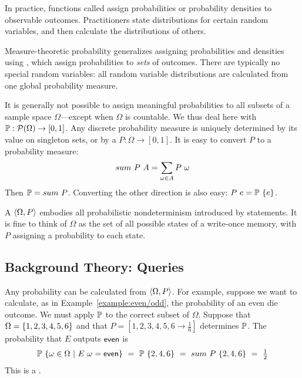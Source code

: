 In practice, functions called  assign probabilities or probability densities to observable outcomes. Practitioners state distributions for certain random variables, and then calculate the distributions of others.

Measure-theoretic probability generalizes assigning probabilities and densities using , which assign probabilities to \textit{sets} of outcomes. There are typically no special random variables: all random variable distributions are calculated from one global probability measure.

It is generally not possible to assign meaningful probabilities to all subsets of a sample space $\Omega$---except when $\Omega$ is countable. We thus deal here with  $\mathbb{P} : \mathcal{P}(\Omega) \to [0,1]$. Any discrete probability measure is uniquely determined by its value on singleton sets, or by a  $P : \Omega \to [0,1]$. It is easy to convert $P$ to a probability measure:
\begin{equation}
	{sum}\ {P}\ {A} = \sum_{\omega \in A} {P}\ {\omega}
\end{equation}
Then $\mathbb{P} = {sum}\ {P}$. Converting the other direction is also easy: ${P}\ {e} = {\mathbb{P}}\ {\{{e}\}}$.

A  $\langle{\Omega,P}\rangle$ embodies all probabilistic nondeterminism introduced by statements. It is fine to think of $\Omega$ as the set of all possible states of a write-once memory, with $P$ assigning a probability to each state.

\subsection{Background Theory: Queries}

Any probability can be calculated from $\langle{\Omega,P}\rangle$. For example, suppose we want to calculate, as in Example~\ref{example:even/odd}, the probability of an even die outcome. We must apply $\mathbb{P}$ to the correct subset of $\Omega$. Suppose that $\Omega = \{{1,2,3,4,5,6}\}$ and that $P = [1,2,3,4,5,6 \to \tfrac{1}{6}]$ determines $\mathbb{P}$. The probability that $E$ outputs $\mathsf{even}$ is
\begin{equation}
	{\mathbb{P}}\ {\lbrace {\omega\in\Omega} \ \lvert\ {{E}\ {\omega} = \mathsf{even}} \rbrace}
		\ =\ {\mathbb{P}}\ {\{{2,4,6}\}}
		\ =\ {sum}\ {P}\ {\{{2,4,6}\}}
		\ =\ \tfrac{1}{2}
\label{eqn:example-prob-query}
\end{equation}
This is a .

